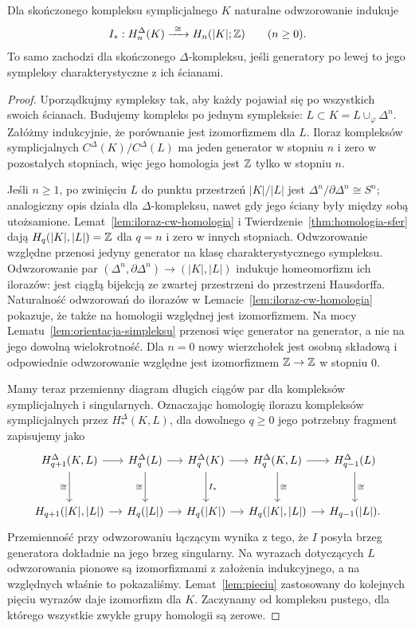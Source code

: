 \begin{twierdzenie}
\label{thm:symplicjalna-singularna}
Dla skończonego kompleksu symplicjalnego
$K$ naturalne odwzorowanie indukuje
\[
 I_*:H_n^\Delta(K)\xrightarrow{\ \cong\ }
 H_n(|K|;\mathbb{Z})
 \qquad(n\geq0).
\]
To samo zachodzi dla skończonego
$\Delta$-kompleksu, jeśli generatory
po lewej to jego sympleksy
charakterystyczne z ich ścianami.
\end{twierdzenie}
\begin{proof}
Uporządkujmy sympleksy tak, aby
każdy pojawiał się po wszystkich
swoich ścianach. Budujemy kompleks
po jednym sympleksie:
$L\subset K=L\cup_\varphi\Delta^n$.
Załóżmy indukcyjnie, że porównanie
jest izomorfizmem dla $L$.
Iloraz kompleksów symplicjalnych
$C^\Delta(K)/C^\Delta(L)$
ma jeden generator w stopniu $n$
i zero w pozostałych stopniach,
więc jego homologia jest $\mathbb{Z}$
tylko w stopniu $n$.

Jeśli $n\geq1$, po zwinięciu $L$
do punktu przestrzeń $|K|/|L|$
jest $\Delta^n/\partial\Delta^n
\cong S^n$; analogiczny opis
działa dla $\Delta$-kompleksu,
nawet gdy jego ściany były
między sobą utożsamione.
Lemat~\ref{lem:iloraz-cw-homologia}
i Twierdzenie~\ref{thm:homologia-sfer}
dają $H_q(|K|,|L|)=\mathbb{Z}$ dla
$q=n$ i zero w innych stopniach.
Odwzorowanie względne przenosi jedyny
generator na klasę charakterystycznego sympleksu.
Odwzorowanie par $(\Delta^n,\partial\Delta^n)\to(|K|,|L|)$
indukuje homeomorfizm ich ilorazów: jest ciągłą bijekcją
ze zwartej przestrzeni do przestrzeni Hausdorffa.
Naturalność odwzorowań do ilorazów w Lemacie~\ref{lem:iloraz-cw-homologia}
pokazuje, że także na homologii względnej jest izomorfizmem.
Na mocy Lematu~\ref{lem:orientacja-simpleksu} przenosi więc
generator na generator, a nie na jego dowolną wielokrotność.
Dla $n=0$ nowy wierzchołek jest
osobną składową i odpowiednie
odwzorowanie względne jest izomorfizmem
$\mathbb{Z}\to\mathbb{Z}$ w stopniu $0$.

Mamy teraz przemienny diagram
długich ciągów par dla kompleksów
symplicjalnych i singularnych.
Oznaczając homologię ilorazu kompleksów symplicjalnych przez
$H_*^\Delta(K,L)$, dla dowolnego $q\geq0$ jego potrzebny fragment zapisujemy jako
\[
\begin{tikzcd}[column sep=small,row sep=large]
 H_{q+1}^\Delta(K,L) \arrow[r] \arrow[d,"\cong" left]
 &H_q^\Delta(L) \arrow[r] \arrow[d,"\cong" left]
 &H_q^\Delta(K) \arrow[r] \arrow[d,"I_*"]
 &H_q^\Delta(K,L) \arrow[r] \arrow[d,"\cong" right]
 &H_{q-1}^\Delta(L) \arrow[d,"\cong" right]\\
 H_{q+1}(|K|,|L|) \arrow[r]
 &H_q(|L|) \arrow[r]
 &H_q(|K|) \arrow[r]
 &H_q(|K|,|L|) \arrow[r]
 &H_{q-1}(|L|).
\end{tikzcd}
\]
Przemienność przy odwzorowaniu łączącym wynika z tego, że
$I$ posyła brzeg generatora dokładnie na jego brzeg singularny.
Na wyrazach dotyczących $L$
odwzorowania pionowe są izomorfizmami
z założenia indukcyjnego,
a na względnych właśnie
to pokazaliśmy. Lemat~\ref{lem:pieciu}
zastosowany do kolejnych pięciu
wyrazów daje izomorfizm dla $K$.
Zaczynamy od kompleksu pustego,
dla którego wszystkie zwykłe
grupy homologii są zerowe.
\end{proof}

